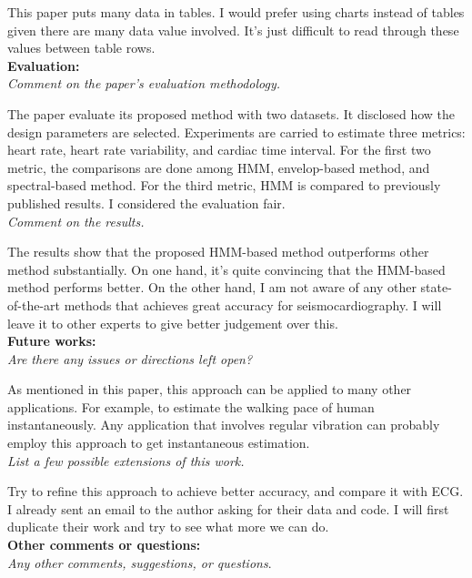 \documentclass[11pt, oneside]{article}   	%
\begin{document}
This paper puts many data in tables. I would prefer using charts instead of tables given there are many data value involved. It's just difficult to read through these values between table rows.\\


\noindent \textbf{Evaluation:}\\
\emph{Comment on the paper's evaluation methodology.}

The paper evaluate its proposed method with two datasets. It disclosed how the design parameters are selected. Experiments are carried to estimate three metrics: heart rate, heart rate variability, and cardiac time interval. For the first two metric, the comparisons are done among HMM, envelop-based method, and spectral-based method. For the third metric, HMM is compared to previously published results. I considered the evaluation fair.\\

\noindent \emph{Comment on the results.}

The results show that the proposed HMM-based method outperforms other method substantially. On one hand, it's quite convincing that the HMM-based method performs better. On the other hand, I am not aware of any other state-of-the-art methods that achieves great accuracy for seismocardiography. I will leave it to other experts to give better judgement over this.\\


\noindent \textbf{Future works:}\\
\emph{Are there any issues or directions left open?}

As mentioned in this paper, this approach can be applied to many other applications. For example, to estimate the walking pace of human instantaneously. Any application that involves regular vibration can probably employ this approach to get instantaneous estimation.\\

\noindent \emph{List a few possible extensions of this work.}

Try to refine this approach to achieve better accuracy, and compare it with ECG. I already sent an email to the author asking for their data and code. I will first duplicate their work and try to see what more we can do.\\


\noindent \textbf{Other comments or questions:}\\
\emph{Any other comments, suggestions, or questions}.
\end{document}
